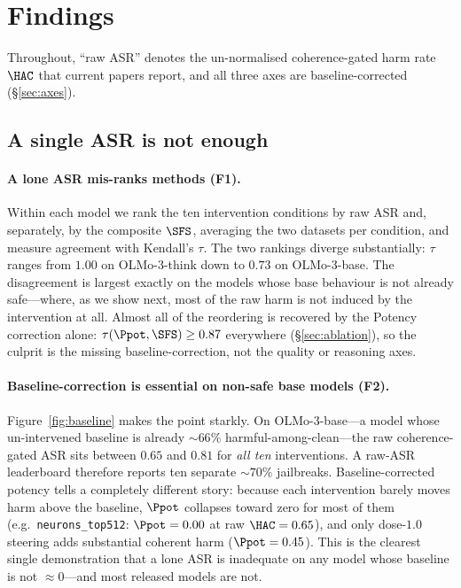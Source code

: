 \section{Findings}
\label{sec:findings}

Throughout, ``raw ASR'' denotes the un-normalised coherence-gated harm rate $\HAC$ that
current papers report, and all three axes are baseline-corrected (\S\ref{sec:axes}).

\subsection{A single ASR is not enough}
\label{sec:f1f2}

\paragraph{A lone ASR mis-ranks methods (F1).} Within each model we rank the ten
intervention conditions by raw ASR and, separately, by the composite $\SFS$, averaging
the two datasets per condition, and measure agreement with Kendall's $\tau$. The two
rankings diverge substantially: $\tau$ ranges from $1.00$ on OLMo-3-think down to
$0.73$ on OLMo-3-base. The disagreement is largest exactly on the models whose base
behaviour is not already safe---where, as we show next, most of the raw harm is not
induced by the intervention at all. Almost all of the reordering is recovered by the
Potency correction alone: $\tau(\Ppot,\SFS)\ge0.87$ everywhere (\S\ref{sec:ablation}),
so the culprit is the missing baseline-correction, not the quality or reasoning axes.

\paragraph{Baseline-correction is essential on non-safe base models (F2).}
Figure~\ref{fig:baseline} makes the point starkly. On OLMo-3-base---a model whose
un-intervened baseline is already ${\sim}66\%$ harmful-among-clean---the raw coherence-gated
ASR sits between $0.65$ and $0.81$ for \emph{all ten} interventions. A raw-ASR leaderboard
therefore reports ten separate ${\sim}70\%$ jailbreaks. Baseline-corrected potency tells a
completely different story: because each intervention barely moves harm above the
baseline, $\Ppot$ collapses toward zero for most of them (e.g.\ \texttt{neurons\_top512}:
$\Ppot=0.00$ at raw $\HAC=0.65$), and only dose-$1.0$ steering adds substantial coherent
harm ($\Ppot=0.45$). This is the clearest single demonstration that a lone ASR is
inadequate on any model whose baseline is not ${\approx}0$---and most released models are
not.

